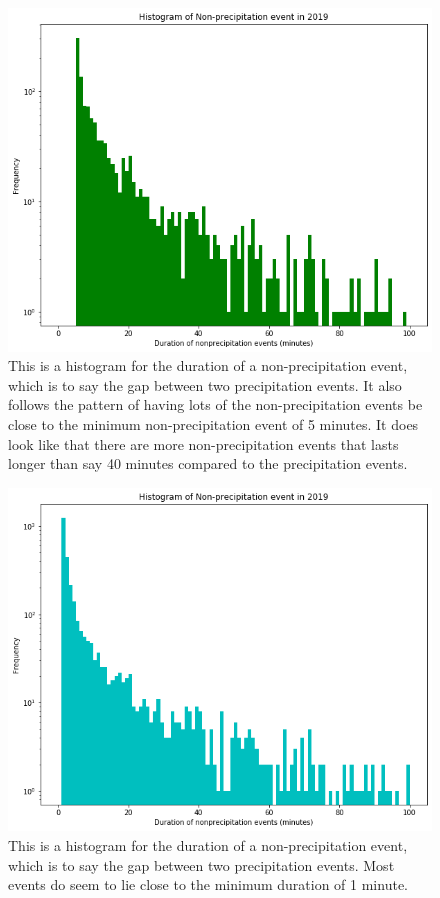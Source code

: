 \documentclass[12pt]{article}
\begin{document}
\begin{figure}[h]
	\centering
	\includegraphics[width=150mm]{nonprecip_hist_5min.png}
	\caption{This is a histogram for the duration of a non-precipitation event, which is to say the gap between two precipitation events. It also follows the pattern of having lots of the non-precipitation events be close to the minimum non-precipitation event of 5 minutes. It does look like that there are more non-precipitation events that lasts longer than say 40 minutes compared to the precipitation events. }
\end{figure}
\begin{figure}[h]
	\centering
	\includegraphics[width=150mm]{nonprecip_hist_1min.png}
	\caption{This is a histogram for the duration of a non-precipitation event, which is to say the gap between two precipitation events. Most events do seem to lie close to the minimum duration of 1 minute. }
\end{figure}
\end{document}
